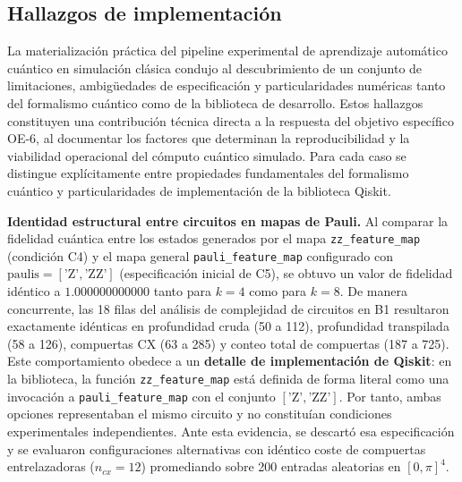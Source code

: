 
\subsection{Hallazgos de implementación}
\label{sec:lecciones_implementacion}

La materialización práctica del pipeline experimental de aprendizaje automático cuántico en simulación clásica
condujo al descubrimiento de un conjunto de limitaciones, ambigüedades de especificación y particularidades numéricas
tanto del formalismo cuántico como de la biblioteca de desarrollo. Estos hallazgos constituyen una contribución técnica
directa a la respuesta del objetivo específico OE-6, al documentar los factores que determinan la reproducibilidad y
la viabilidad operacional del cómputo cuántico simulado. Para cada caso se distingue explícitamente entre propiedades
fundamentales del formalismo cuántico y particularidades de implementación de la biblioteca Qiskit.

\textbf{Identidad estructural entre circuitos en mapas de Pauli.} Al comparar la fidelidad cuántica entre los
estados generados por el mapa \texttt{zz\_feature\_map} (condición C4) y el mapa general \texttt{pauli\_feature\_map}
configurado con $\text{paulis} = [\text{'Z'},\text{'ZZ'}]$ (especificación inicial de C5), se obtuvo un valor
de fidelidad idéntico a $1.000000000000$ tanto para $k = 4$ como para $k = 8$. De manera concurrente, las 18 filas del análisis
de complejidad de circuitos en B1 resultaron exactamente idénticas en profundidad cruda (50 a 112), profundidad transpilada
(58 a 126), compuertas CX (63 a 285) y conteo total de compuertas (187 a 725). Este comportamiento obedece a un
\textbf{detalle de implementación de Qiskit}: en la biblioteca, la función \texttt{zz\_feature\_map} está definida de
forma literal como una invocación a \texttt{pauli\_feature\_map} con el conjunto $[\text{'Z'},\text{'ZZ'}]$. Por tanto,
ambas opciones representaban el mismo circuito y no constituían condiciones experimentales independientes. Ante esta evidencia,
se descartó esa especificación y se evaluaron configuraciones alternativas con idéntico coste de compuertas
entrelazadoras ($n_{cx} = 12$) promediando sobre 200 entradas aleatorias en $[0, \pi]^4$.

